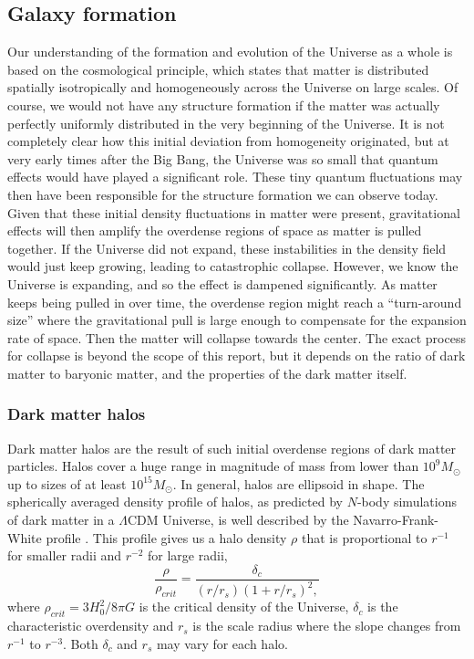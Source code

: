 \subsection{Galaxy formation}

Our understanding of the formation and evolution of the Universe as a whole is based on the cosmological principle, which states that matter is distributed spatially isotropically and homogeneously across the Universe on large scales. Of course, we would not have any structure formation if the matter was actually perfectly uniformly distributed in the very beginning of the Universe. It is not completely clear how this initial deviation from homogeneity originated, but at very early times after the Big Bang, the Universe was so small that quantum effects would have played a significant role. These tiny quantum fluctuations may then have been responsible for the structure formation we can observe today. Given that these initial density fluctuations in matter were present, gravitational effects will then amplify the overdense regions of space as matter is pulled together. If the Universe did not expand, these instabilities in the density field would just keep growing, leading to catastrophic collapse. However, we know the Universe is expanding, and so the effect is dampened significantly. As matter keeps being pulled in over time, the overdense region might reach a ``turn-around size'' where the gravitational pull is large enough to compensate for the expansion rate of space. Then the matter will collapse towards the center. The exact process for collapse is beyond the scope of this report, but it depends on the ratio of dark matter to baryonic matter, and the properties of the dark matter itself. 

\subsubsection{Dark matter halos}
Dark matter halos are the result of such initial overdense regions of dark matter particles. Halos cover a huge range in magnitude of mass from lower than $10^9 M_{\odot}$ up to sizes of at least $10^{15} M_{\odot}$. In general, halos are ellipsoid in shape. The spherically averaged density profile of halos, as predicted by $N$-body simulations of dark matter in a $\Lambda$CDM Universe, is well described by the Navarro-Frank-White profile \parencite{Navarro1996}. This profile gives us a halo density $\rho$ that is proportional to $r^{-1}$ for smaller radii and $r^{-2}$ for large radii,
\begin{equation}
    \frac{\rho}{\rho_{crit}} = \frac{\delta_c}{(r/r_s)(1+r/r_s)^2,}
\end{equation}
where $\rho_{crit} = 3H_0^2/8\pi G$ is the critical density of the Universe, $\delta_c$ is the characteristic overdensity and $r_s$ is the scale radius where the slope changes from $r^{-1}$ to $r^{-3}$. Both $\delta_c$ and $r_s$ may vary for each halo.

